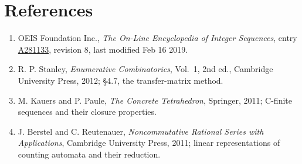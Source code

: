 \documentclass[11pt]{article}
\theoremstyle{definition}
\begin{document}
\section{References}

\begin{enumerate}

\item OEIS Foundation Inc., \emph{The On-Line Encyclopedia of Integer Sequences}, entry \href{https://oeis.org/A281133}{A281133}, revision 8, last modified Feb 16 2019.

\item R. P. Stanley, \emph{Enumerative Combinatorics}, Vol.~1, 2nd ed., Cambridge University Press, 2012; \S4.7, the transfer-matrix method.

\item M. Kauers and P. Paule, \emph{The Concrete Tetrahedron}, Springer, 2011; C-finite sequences and their closure properties.

\item J. Berstel and C. Reutenauer, \emph{Noncommutative Rational Series with Applications}, Cambridge University Press, 2011; linear representations of counting automata and their reduction.

\end{enumerate}
\end{document}
